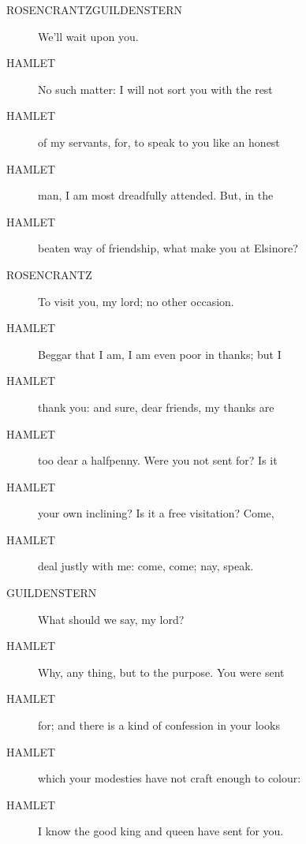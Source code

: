 \documentclass{article}
\begin{document}
\begin{description}
            
\item[ROSENCRANTZGUILDENSTERN] We'll wait upon you.
\end{description}
          
\begin{description}
            
\item[HAMLET] No such matter: I will not sort you with the rest
\item[HAMLET] of my servants, for, to speak to you like an honest
\item[HAMLET] man, I am most dreadfully attended. But, in the
\item[HAMLET] beaten way of friendship, what make you at Elsinore?
\end{description}
          
\begin{description}
            
\item[ROSENCRANTZ] To visit you, my lord; no other occasion.
\end{description}
          
\begin{description}
            
\item[HAMLET] Beggar that I am, I am even poor in thanks; but I
\item[HAMLET] thank you: and sure, dear friends, my thanks are
\item[HAMLET] too dear a halfpenny. Were you not sent for? Is it
\item[HAMLET] your own inclining? Is it a free visitation? Come,
\item[HAMLET] deal justly with me: come, come; nay, speak.
\end{description}
          
\begin{description}
            
\item[GUILDENSTERN] What should we say, my lord?
\end{description}
          
\begin{description}
            
\item[HAMLET] Why, any thing, but to the purpose. You were sent
\item[HAMLET] for; and there is a kind of confession in your looks
\item[HAMLET] which your modesties have not craft enough to colour:
\item[HAMLET] I know the good king and queen have sent for you.
\end{description}
          
\end{document}
